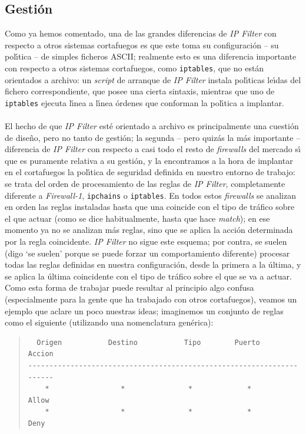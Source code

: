 \subsection{Gesti\'on}
Como ya hemos comentado, una de las grandes diferencias de {\it IP Filter} con
respecto a otros sistemas cortafuegos es que este toma su configuraci\'on -- su 
pol\'{\i}tica -- de simples ficheros ASCII; realmente esto es una diferencia 
importante con respecto a
otros sistemas cortafuegos, como {\tt iptables}, que no est\'an orientados a
archivo: un {\it script} de arranque de {\it IP Filter} instala pol\'{\i}ticas
le\'{\i}das del fichero correspondiente, que posee una cierta sintaxis,
mientras que uno de {\tt iptables} ejecuta l\'{\i}nea a l\'{\i}nea \'ordenes
que conforman la pol\'{\i}tica a implantar.\\
\\El hecho de que {\it IP Filter} est\'e orientado a archivo es principalmente
una cuesti\'on de dise\~no, pero no tanto de gesti\'on; la segunda -- pero 
quiz\'as la m\'as importante -- diferencia de {\it IP Filter} con respecto a 
casi todo el resto de {\it firewalls} del mercado s\'{\i} que es puramente 
relativa a su gesti\'on, y la encontramos a la hora de implantar en el 
cortafuegos la pol\'{\i}tica de seguridad definida en nuestro entorno de 
trabajo: se trata del orden de procesamiento de las reglas de {\it IP Filter}, 
completamente diferente a {\it Firewall-1}, {\tt ipchains} o {\tt iptables}. En 
todos estos {\it firewalls} se analizan en orden las reglas instaladas hasta 
que una coincide con el tipo de tr\'afico sobre el que actuar (como se dice 
habitualmente, hasta que hace {\it match}); en ese momento ya no se analizan 
m\'as reglas, sino 
que se aplica la acci\'on determinada por la regla coincidente. {\it IP Filter}
no sigue este esquema; por contra, se suelen (digo `se suelen' porque se puede
forzar un comportamiento diferente) procesar todas las reglas definidas en
nuestra configuraci\'on, desde la primera a la \'ultima, y se aplica la 
\'ultima coincidente con el tipo de tr\'afico sobre el que se va a actuar. Como
esta forma de trabajar puede resultar al principio algo confusa (especialmente
para la gente que ha trabajado con otros cortafuegos), veamos un ejemplo que
aclare un poco nuestras ideas; imaginemos un conjunto de reglas como el 
siguiente (utilizando una nomenclatura gen\'erica):
\begin{quote}
\begin{verbatim}
  Origen           Destino           Tipo        Puerto        Accion
----------------------------------------------------------------------
    *                 *               *             *           Allow
    *                 *               *             *           Deny
\end{verbatim}
\end{quote}
